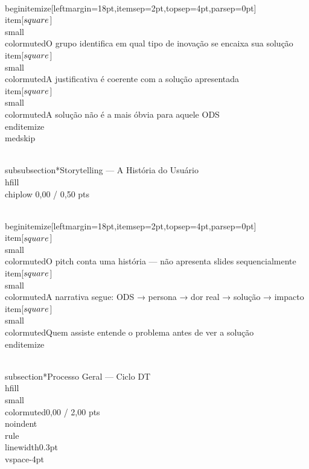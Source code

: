 \documentclass[11pt, a4paper]{article}
\newcommand{\chiplow}[1]{\colorbox{crimsondim}{\color{crimson}\semibold\small\strut\ #1\ }}
\begin{document}
\\begin{itemize}[leftmargin=18pt,itemsep=2pt,topsep=4pt,parsep=0pt]
  \\item[$\\square$] {\\small\\color{muted}O grupo identifica em qual tipo de inovação se encaixa sua solução}
  \\item[$\\square$] {\\small\\color{muted}A justificativa é coerente com a solução apresentada}
  \\item[$\\square$] {\\small\\color{muted}A solução não é a mais óbvia para aquele ODS}
\\end{itemize}
\\medskip

\\subsubsection*{Storytelling — A História do Usuário \\hfill {\\chiplow 0,00 / 0,50 pts}}

\\begin{itemize}[leftmargin=18pt,itemsep=2pt,topsep=4pt,parsep=0pt]
  \\item[$\\square$] {\\small\\color{muted}O pitch conta uma história — não apresenta slides sequencialmente}
  \\item[$\\square$] {\\small\\color{muted}A narrativa segue: ODS → persona → dor real → solução → impacto}
  \\item[$\\square$] {\\small\\color{muted}Quem assiste entende o problema antes de ver a solução}
\\end{itemize}

\\subsection*{Processo Geral — Ciclo DT \\hfill {\\small\\color{muted}0,00 / 2,00 pts}}
\\noindent\\rule{\\linewidth}{0.3pt}\\vspace{-4pt}
\end{document}
